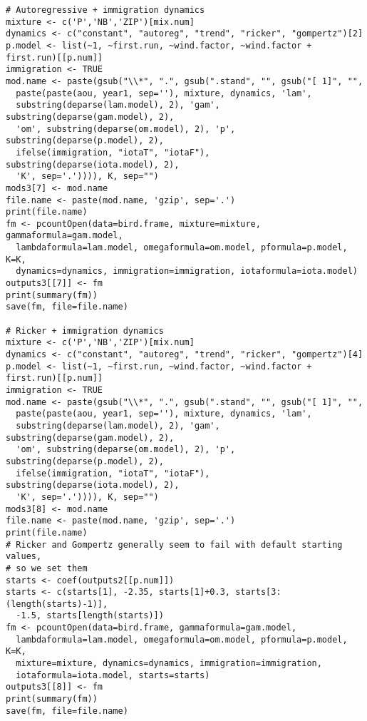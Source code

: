 \documentclass[12pt]{article}
\begin{document}
\begin{verbatim}
# Autoregressive + immigration dynamics
mixture <- c('P','NB','ZIP')[mix.num]
dynamics <- c("constant", "autoreg", "trend", "ricker", "gompertz")[2]
p.model <- list(~1, ~first.run, ~wind.factor, ~wind.factor + first.run)[[p.num]]
immigration <- TRUE
mod.name <- paste(gsub("\\*", ".", gsub(".stand", "", gsub("[ 1]", "", 
  paste(paste(aou, year1, sep=''), mixture, dynamics, 'lam', 
  substring(deparse(lam.model), 2), 'gam', substring(deparse(gam.model), 2), 
  'om', substring(deparse(om.model), 2), 'p', substring(deparse(p.model), 2), 
  ifelse(immigration, "iotaT", "iotaF"), substring(deparse(iota.model), 2),
  'K', sep='.')))), K, sep="")
mods3[7] <- mod.name
file.name <- paste(mod.name, 'gzip', sep='.')
print(file.name)
fm <- pcountOpen(data=bird.frame, mixture=mixture, gammaformula=gam.model, 
  lambdaformula=lam.model, omegaformula=om.model, pformula=p.model, K=K, 
  dynamics=dynamics, immigration=immigration, iotaformula=iota.model)
outputs3[[7]] <- fm
print(summary(fm))
save(fm, file=file.name)

# Ricker + immigration dynamics
mixture <- c('P','NB','ZIP')[mix.num]
dynamics <- c("constant", "autoreg", "trend", "ricker", "gompertz")[4]
p.model <- list(~1, ~first.run, ~wind.factor, ~wind.factor + first.run)[[p.num]]
immigration <- TRUE
mod.name <- paste(gsub("\\*", ".", gsub(".stand", "", gsub("[ 1]", "", 
  paste(paste(aou, year1, sep=''), mixture, dynamics, 'lam', 
  substring(deparse(lam.model), 2), 'gam', substring(deparse(gam.model), 2), 
  'om', substring(deparse(om.model), 2), 'p', substring(deparse(p.model), 2), 
  ifelse(immigration, "iotaT", "iotaF"), substring(deparse(iota.model), 2),
  'K', sep='.')))), K, sep="")
mods3[8] <- mod.name
file.name <- paste(mod.name, 'gzip', sep='.')
print(file.name)
# Ricker and Gompertz generally seem to fail with default starting values, 
# so we set them
starts <- coef(outputs2[[p.num]])
starts <- c(starts[1], -2.35, starts[1]+0.3, starts[3:(length(starts)-1)], 
  -1.5, starts[length(starts)])
fm <- pcountOpen(data=bird.frame, gammaformula=gam.model, 
  lambdaformula=lam.model, omegaformula=om.model, pformula=p.model, K=K, 
  mixture=mixture, dynamics=dynamics, immigration=immigration, 
  iotaformula=iota.model, starts=starts)
outputs3[[8]] <- fm
print(summary(fm))
save(fm, file=file.name)


\end{verbatim}
\end{document}
